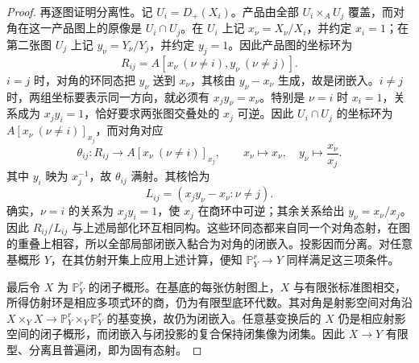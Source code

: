 \begin{proof}
	再逐图证明分离性。记 \(U_i=D_+(X_i)\)。产品由全部 \(U_i\times_AU_j\) 覆盖，而对角在这一产品图上的原像是 \(U_i\cap U_j\)。在 \(U_i\) 上记 \(x_\nu=X_\nu/X_i\)，并约定 \(x_i=1\)；在第二张图 \(U_j\) 上记 \(y_\nu=Y_\nu/Y_j\)，并约定 \(y_j=1\)。因此产品图的坐标环为
	\[
		R_{ij}=A[x_\nu\ (\nu\ne i),y_\nu\ (\nu\ne j)].
	\]
	\(i=j\) 时，对角的环同态把 \(y_\nu\) 送到 \(x_\nu\)，其核由 \(y_\nu-x_\nu\) 生成，故是闭嵌入。\(i\ne j\) 时，两组坐标要表示同一方向，就必须有 \(x_jy_\nu=x_\nu\)。特别是 \(\nu=i\) 时 \(x_i=1\)，关系成为 \(x_jy_i=1\)，恰好要求两张图交叠处的 \(x_j\) 可逆。因此 \(U_i\cap U_j\) 的坐标环为 \(A[x_\nu\ (\nu\ne i)]_{x_j}\)，而对角对应
	\[
		\theta_{ij}:R_{ij}\longrightarrow A[x_\nu\ (\nu\ne i)]_{x_j}, \qquad x_\nu\longmapsto x_\nu, \quad y_\nu\longmapsto\frac{x_\nu}{x_j}.
	\]
	其中 \(y_i\) 映为 \(x_j^{-1}\)，故 \(\theta_{ij}\) 满射。其核恰为
	\[
		L_{ij}=(x_jy_\nu-x_\nu:\nu\ne j).
	\]
	确实，\(\nu=i\) 的关系为 \(x_jy_i=1\)，使 \(x_j\) 在商环中可逆；其余关系给出 \(y_\nu=x_\nu/x_j\)。因此 \(R_{ij}/L_{ij}\) 与上述局部化环互相同构。这些环同态都来自同一个对角态射，在图的重叠上相容，所以全部局部闭嵌入黏合为对角的闭嵌入。投影因而分离。对任意基概形 \(Y\)，在其仿射开集上应用上述计算，便知 \(\mathbb P_Y^r\to Y\) 同样满足这三项条件。

	最后令 \(X\) 为 \(\mathbb P_Y^r\) 的闭子概形。在基底的每张仿射图上，\(X\) 与有限张标准图相交，所得仿射环是相应多项式环的商，仍为有限型底环代数。其对角是射影空间对角沿 \(X\times_YX\to\mathbb P_Y^r\times_Y\mathbb P_Y^r\) 的基变换，故仍为闭嵌入。任意基变换后的 \(X\) 仍是相应射影空间的闭子概形，而闭嵌入与闭投影的复合保持闭集像为闭集。因此 \(X\to Y\) 有限型、分离且普遍闭，即为固有态射。
\end{proof}
